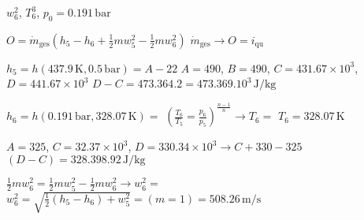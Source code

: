 \( w_6^2 \), \( T_6^3 \), \( p_0 = 0.191 \, \text{bar} \)  

\( O = \dot{m}_{\text{ges}} (h_5 - h_6 + \frac{1}{2} m w_5^2 - \frac{1}{2} m w_6^2) \)  
\( \dot{m}_{\text{ges}} \rightarrow O = i_{\text{qu}} \)  

\( h_5 = h (437.9 \, \text{K}, 0.5 \, \text{bar}) = A - 22 \)  
\( A = 490 \), \( B = 490 \), \( C = 431.67 \times 10^3 \), \( D = 441.67 \times 10^3 \)  
\( D - C = 473.364.2 = 473.369.10^3 \, \text{J/kg} \)  

\( h_6 = h (0.191 \, \text{bar}, 328.07 \, \text{K}) = \)  
\( \left( \frac{T_6}{T_5} = \frac{p_6}{p_5} \right)^{\frac{n-1}{n}} \rightarrow T_6 = \)  
\( T_6 = 328.07 \, \text{K} \)  

\( A = 325 \), \( C = 32.37 \times 10^3 \), \( D = 330.34 \times 10^3 \rightarrow C + 330 - 325 \)  
\( (D - C) = 328.398.92 \, \text{J/kg} \)  

\( \frac{1}{2} m w_6^2 = \frac{1}{2} m w_5^2 - \frac{1}{2} m w_6^2 \rightarrow w_6^2 = \)  
\( w_6^2 = \sqrt{\frac{1}{2} (h_5 - h_6) + w_5^2} = (m = 1) = 508.26 \, \text{m/s} \)